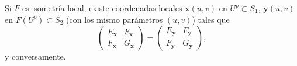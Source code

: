 \begin{theorem}
Si $\displaystyle F $ es isometría local, existe coordenadas locales $\displaystyle \textbf{x} \left(u,v\right) $ en $\displaystyle U^{p}\subset S_{1} $, $\displaystyle \textbf{y} \left(u,v\right) $ en $\displaystyle F\left(U^{p}\right)\subset S_{2} $ (con los mismo parámetros $\displaystyle \left(u,v\right) $) tales que 
\[ \begin{pmatrix} E_{ \textbf{x} } & F _{ \textbf{x} } \\ F_{ \textbf{x} } & G _{ \textbf{x} } \end{pmatrix}=\begin{pmatrix} E_{ \textbf{y} } & F_{ \textbf{y} } \\ F_{ \textbf{y} } & G_{ \textbf{y} } \end{pmatrix} ,\]
y conversamente.
\end{theorem}


